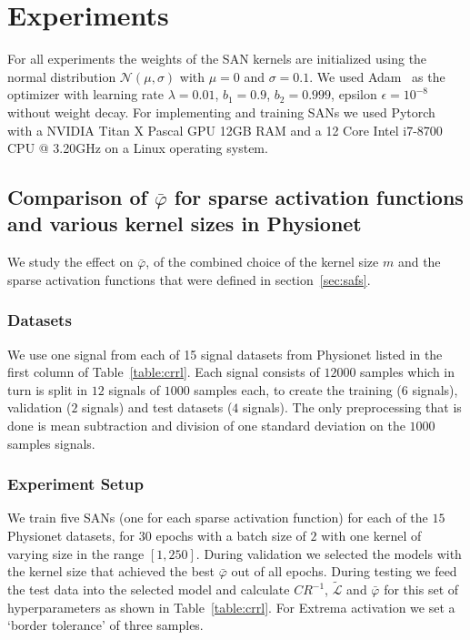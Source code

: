 \documentclass[journal]{IEEEtran}
\begin{document}
\section{Experiments}
\label{sec:experiments}
For all experiments the weights of the SAN kernels are initialized using the normal distribution $\mathcal{N}(\mu, \sigma)$ with $\mu=0$ and $\sigma=0.1$.
We used Adam~\cite{kingma2014adam} as the optimizer with learning rate $\lambda=0.01$, $b_1=0.9$, $b_2=0.999$, epsilon $\epsilon=10^{-8}$ without weight decay.
For implementing and training SANs we used Pytorch~\cite{paszke2017automatic} with a NVIDIA Titan X Pascal GPU 12GB RAM and a 12 Core Intel i7-8700 CPU @ 3.20GHz on a Linux operating system.

\subsection{Comparison of $\bar\varphi$ for sparse activation functions and various kernel sizes in Physionet}
We study the effect on $\bar\varphi$, of the combined choice of the kernel size $m$ and the sparse activation functions that were defined in section~\ref{sec:safs}.

\subsubsection{Datasets}
We use one signal from each of 15 signal datasets from Physionet listed in the first column of Table~\ref{table:crrl}.
Each signal consists of $12000$ samples which in turn is split in $12$ signals of $1000$ samples each, to create the training ($6$ signals), validation ($2$ signals) and test datasets ($4$ signals).
The only preprocessing that is done is mean subtraction and division of one standard deviation on the $1000$ samples signals.

\subsubsection{Experiment Setup}
We train five SANs (one for each sparse activation function) for each of the $15$ Physionet datasets, for $30$ epochs with a batch size of $2$ with one kernel of varying size in the range $[1, 250]$.
During validation we selected the models with the kernel size that achieved the best $\bar\varphi$ out of all epochs.
During testing we feed the test data into the selected model and calculate $CR^{-1}$, $\tilde{\mathcal{L}}$ and $\bar\varphi$ for this set of hyperparameters as shown in Table~\ref{table:crrl}.
For Extrema activation we set a `border tolerance' of three samples.
\end{document}
